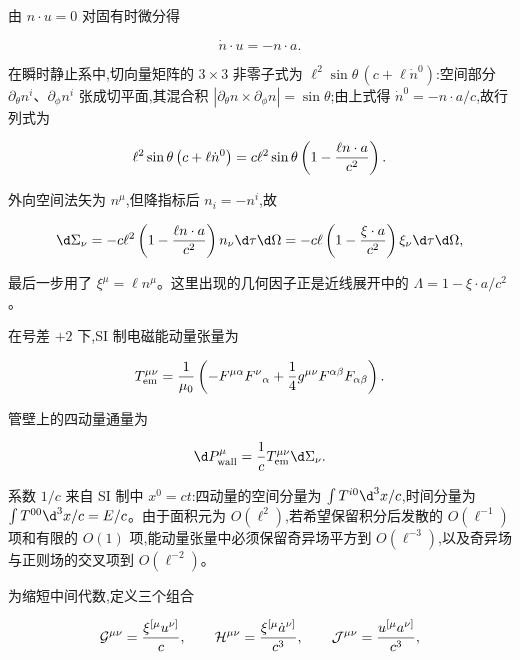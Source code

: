 由 $n\cdot u=0$ 对固有时微分得

\begin{equation*}
 \dot n\cdot u=-n\cdot a.
\end{equation*}

在瞬时静止系中,切向量矩阵的 $3\times3$ 非零子式为 $\ell^2\sin\theta\,(c+\ell\dot n^0)$:空间部分 $\partial_\theta n^i$、$\partial_\phi n^i$ 张成切平面,其混合积 $|\partial_\theta n\times\partial_\phi n|=\sin\theta$;由上式得 $\dot n^0=-n\cdot a/c$,故行列式为

\begin{equation*}
 \ell^2\sin\theta\left(c+\ell\dot n^0\right)
 =c\ell^2\sin\theta\left(1-{\ell n\cdot a\over c^2}\right).
\end{equation*}

外向空间法矢为 $n^\mu$,但降指标后 $n_i=-n^i$,故

\begin{equation*}
 \d\Sigma_\nu
 =-c\ell^2\left(1-{\ell n\cdot a\over c^2}\right)n_\nu\d\tau\d\Omega
 =-c\ell\left(1-{\xi\cdot a\over c^2}\right)\xi_\nu\d\tau\d\Omega,
\end{equation*}

最后一步用了 $\xi^\mu=\ell n^\mu$。这里出现的几何因子正是近线展开中的 $\Lambda=1-\xi\cdot a/c^2$。

在号差 $+2$ 下,SI 制电磁能动量张量为

\begin{equation*}
 T_{\mathrm{em}}^{\mu\nu}
 ={1\over\mu_0}
 \left(
 -F^{\mu\alpha}F^\nu{}_{\alpha}
 +{1\over4}g^{\mu\nu}F^{\alpha\beta}F_{\alpha\beta}
 \right).
\end{equation*}

管壁上的四动量通量为

\begin{equation*}
 \d P_{\mathrm{wall}}^\mu
 ={1\over c}T_{\mathrm{em}}^{\mu\nu}\d\Sigma_\nu.
\end{equation*}

系数 $1/c$ 来自 SI 制中 $x^0=ct$:四动量的空间分量为 $\int T^{i0}\d^3x/c$,时间分量为 $\int T^{00}\d^3x/c=E/c$。由于面积元为 $O(\ell^2)$,若希望保留积分后发散的 $O(\ell^{-1})$ 项和有限的 $O(1)$ 项,能动量张量中必须保留奇异场平方到 $O(\ell^{-3})$,以及奇异场与正则场的交叉项到 $O(\ell^{-2})$。

为缩短中间代数,定义三个组合

\begin{equation*}
 \mathcal G^{\mu\nu}={\xi^{[\mu}u^{\nu]}\over c},
 \qquad
 \mathcal H^{\mu\nu}={\xi^{[\mu}\dot a^{\nu]}\over c^3},
 \qquad
 \mathcal J^{\mu\nu}={u^{[\mu}a^{\nu]}\over c^3},
\end{equation*}

